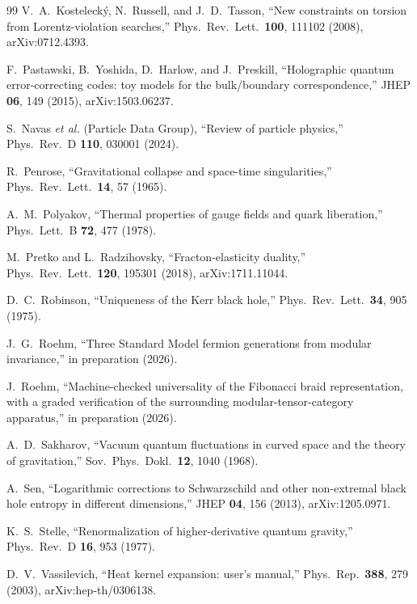 \documentclass[aps,prd,nofootinbib,superscriptaddress,12pt]{revtex4-2}
\begin{document}
\begin{thebibliography}{99}
V.~A.~Kosteleck\'y, N.~Russell, and J.~D.~Tasson,
``New constraints on torsion from Lorentz-violation searches,''
Phys.\ Rev.\ Lett.\ \textbf{100}, 111102 (2008),
arXiv:0712.4393.

F.~Pastawski, B.~Yoshida, D.~Harlow, and J.~Preskill,
``Holographic quantum error-correcting codes: toy models for the
bulk/boundary correspondence,''
JHEP \textbf{06}, 149 (2015),
arXiv:1503.06237.

S.~Navas \emph{et al.} (Particle Data Group),
``Review of particle physics,''
Phys.\ Rev.\ D \textbf{110}, 030001 (2024).

R.~Penrose,
``Gravitational collapse and space-time singularities,''
Phys.\ Rev.\ Lett.\ \textbf{14}, 57 (1965).

A.~M.~Polyakov,
``Thermal properties of gauge fields and quark liberation,''
Phys.\ Lett.\ B \textbf{72}, 477 (1978).

M.~Pretko and L.~Radzihovsky,
``Fracton-elasticity duality,''
Phys.\ Rev.\ Lett.\ \textbf{120}, 195301 (2018),
arXiv:1711.11044.

D.~C.~Robinson,
``Uniqueness of the Kerr black hole,''
Phys.\ Rev.\ Lett.\ \textbf{34}, 905 (1975).

J.~G.~Roehm,
``Three Standard Model fermion generations from modular invariance,''
in preparation (2026).

J.~Roehm,
``Machine-checked universality of the Fibonacci braid representation,
with a graded verification of the surrounding modular-tensor-category apparatus,''
in preparation (2026).

A.~D.~Sakharov,
``Vacuum quantum fluctuations in curved space and the theory of
gravitation,''
Sov.\ Phys.\ Dokl.\ \textbf{12}, 1040 (1968).

A.~Sen,
``Logarithmic corrections to Schwarzschild and other non-extremal black
hole entropy in different dimensions,''
JHEP \textbf{04}, 156 (2013),
arXiv:1205.0971.

K.~S.~Stelle,
``Renormalization of higher-derivative quantum gravity,''
Phys.\ Rev.\ D \textbf{16}, 953 (1977).

D.~V.~Vassilevich,
``Heat kernel expansion: user's manual,''
Phys.\ Rep.\ \textbf{388}, 279 (2003),
arXiv:hep-th/0306138.


\end{thebibliography}
\end{document}
